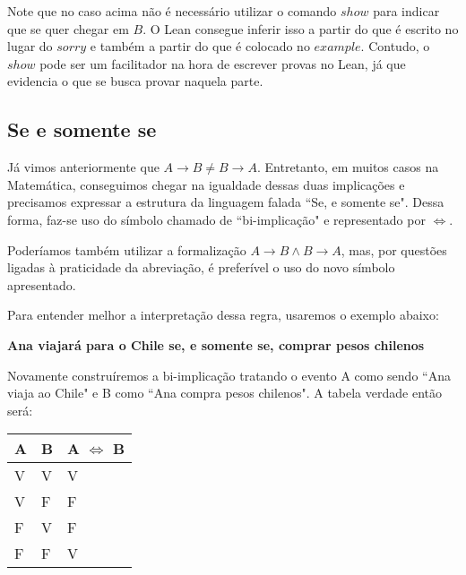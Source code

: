 Note que no caso acima não é necessário utilizar o comando $show$ para indicar que se quer chegar em $B$. O Lean consegue inferir isso a partir do que é escrito no lugar do $sorry$ e também a partir do que é colocado no $example$. Contudo, o $show$ pode ser um facilitador na hora de escrever provas no Lean, já que evidencia o que se busca provar naquela parte.  

\subsection{Se e somente se}

Já vimos anteriormente que $A \rightarrow B \neq B \rightarrow A$. Entretanto, em muitos casos na Matemática, conseguimos chegar na igualdade dessas duas implicações e precisamos expressar a estrutura da linguagem falada ``Se, e somente se". Dessa forma, faz-se uso do símbolo chamado de ``bi-implicação" e representado por $\iff$.


Poderíamos também utilizar a formalização $A \rightarrow B \land B \rightarrow A$, mas, por questões ligadas à praticidade da abreviação, é preferível o uso do novo símbolo apresentado.


Para entender melhor a interpretação dessa regra, usaremos o exemplo abaixo:

\begin{center}
    \textbf{Ana viajará para o Chile se, e somente se, comprar pesos chilenos}
\end{center}

Novamente construíremos a bi-implicação tratando o evento A como sendo ``Ana viaja ao Chile" e B como ``Ana compra pesos chilenos". A tabela verdade então será:

\begin{table}[htb]
\centering
\begin{tabular}{|l|l|l|}
\hline

\textbf{A} & \textbf{B} & \textbf{A $\iff$ B} \\ \hline
V          & V          & V                  \\ \hline
V          & F          & F                  \\ \hline
F          & V          & F                  \\ \hline
F          & F          & V                  \\ \hline

\end{tabular}
\end{table}

